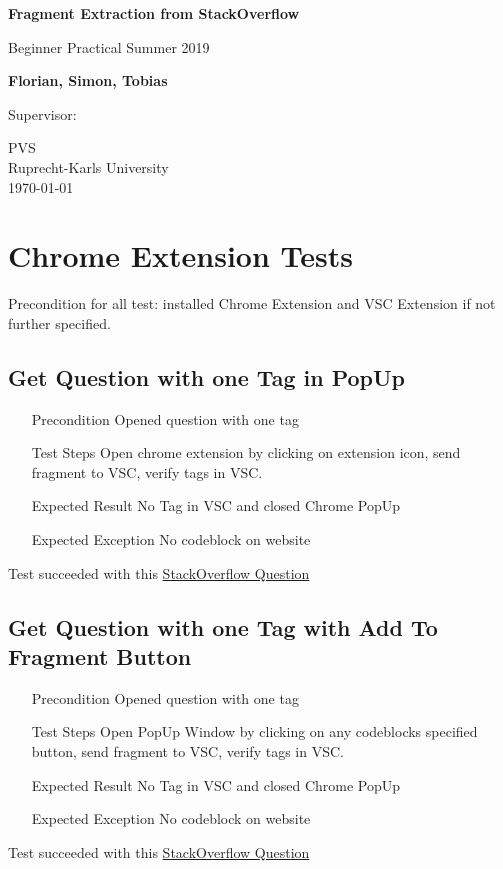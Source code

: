 \documentclass{report}
\begin{document}
\begin{titlepage}
	\begin{center}
	\vspace*{1cm}
	\Huge

	\textbf{Fragment Extraction from StackOverflow}

	\vspace{0.5cm}
	\LARGE

	Beginner Practical Summer 2019

	\vspace{1.5cm}

	\textbf{Florian, Simon, Tobias}

	\vspace{1cm}
	Supervisor:
	\vfill


	\vspace{1.8cm}
	\Large
	PVS\\
	Ruprecht-Karls University\\
	\today
	\end{center}
    \end{titlepage}

\section*{Chrome Extension Tests}
Precondition for all test: installed Chrome Extension and VSC Extension if not further specified.
\subsection*{Get Question with one Tag in PopUp}
\begin{itemize}
	\item[Precondition] Opened question with one tag
	\item[Test Steps] Open chrome extension by clicking on extension icon, send fragment to VSC, verify tags in VSC.
	\item[Expected Result] No Tag in VSC and closed Chrome PopUp
	\item[Expected Exception] No codeblock on website
\end{itemize}
Test succeeded with this
\href{https://stackoverflow.com/questions/6393943/convert-javascript-string-in-dot-notation-into-an-object-reference}{StackOverflow Question}

\subsection*{Get Question with one Tag with Add To Fragment Button}
\begin{itemize}
	\item[Precondition] Opened question with one tag
	\item[Test Steps] Open PopUp Window by clicking on any codeblocks specified button, send fragment to VSC, verify tags in VSC.
	\item[Expected Result] No Tag in VSC and closed Chrome PopUp
	\item[Expected Exception] No codeblock on website
\end{itemize}
Test succeeded with this
\href{https://stackoverflow.com/questions/6393943/convert-javascript-string-in-dot-notation-into-an-object-reference}{StackOverflow Question}
\end{document}
